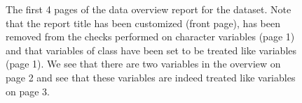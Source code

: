\documentclass[article,shortnames]{jss}
\begin{document}
\begin{figure}[tb]
\begin{center}
\end{center}
\caption{The first 4 pages of the data overview report for the  dataset. Note that the report title has been customized (front page),  has been removed from the checks performed on character variables (page 1) and that variables of class  have been set to be treated like  variables (page 1). We see that there are two  variables in the overview on page 2 and see that these variables are indeed treated like  variables on page 3. }
\label{fig:bigExampleP0123}
\end{figure}
\end{document}
